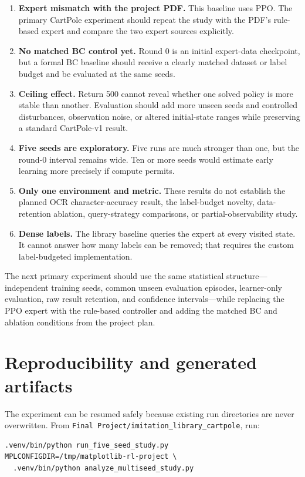 \documentclass[11pt]{article}
\begin{document}
\begin{enumerate}
  \item \textbf{Expert mismatch with the project PDF.} This baseline uses PPO. The primary CartPole experiment should repeat the study with the PDF's rule-based expert and compare the two expert sources explicitly.
  \item \textbf{No matched BC control yet.} Round 0 is an initial expert-data checkpoint, but a formal BC baseline should receive a clearly matched dataset or label budget and be evaluated at the same seeds.
  \item \textbf{Ceiling effect.} Return 500 cannot reveal whether one solved policy is more stable than another. Evaluation should add more unseen seeds and controlled disturbances, observation noise, or altered initial-state ranges while preserving a standard CartPole-v1 result.
  \item \textbf{Five seeds are exploratory.} Five runs are much stronger than one, but the round-0 interval remains wide. Ten or more seeds would estimate early learning more precisely if compute permits.
  \item \textbf{Only one environment and metric.} These results do not establish the planned OCR character-accuracy result, the label-budget novelty, data-retention ablation, query-strategy comparisons, or partial-observability study.
  \item \textbf{Dense labels.} The library baseline queries the expert at every visited state. It cannot answer how many labels can be removed; that requires the custom label-budgeted implementation.
\end{enumerate}

The next primary experiment should use the same statistical structure---independent training seeds, common unseen evaluation episodes, learner-only evaluation, raw result retention, and confidence intervals---while replacing the PPO expert with the rule-based controller and adding the matched BC and ablation conditions from the project plan.

\section{Reproducibility and generated artifacts}

The experiment can be resumed safely because existing run directories are never overwritten. From \texttt{Final Project/imitation\_library\_cartpole}, run:

\begin{verbatim}
.venv/bin/python run_five_seed_study.py
MPLCONFIGDIR=/tmp/matplotlib-rl-project \
  .venv/bin/python analyze_multiseed_study.py
\end{verbatim}
\end{document}
